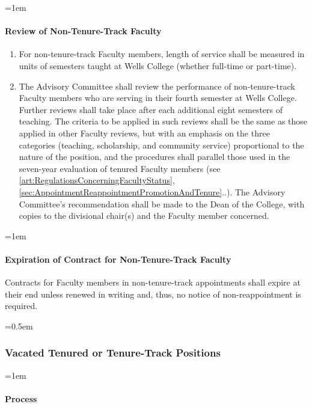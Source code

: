 \documentclass{manual}
\let\oldsubsubsection\subsubsection
\renewcommand\subsubsection{\leftskip=0.5em\oldsubsubsection}
\let\oldparagraph\paragraph
\renewcommand\paragraph{\leftskip=1em\oldparagraph}
\newcommand{\itemLevelA}{\alph*.}
\newcommand{\itemRefA}{\alph*}
\begin{document}
			\paragraph{Review of Non-Tenure-Track Faculty}\label{par:ReviewOfPartTimeVisitingAndOtherNonTenureTrackOfficersOfInstruction}

				\begin{enumerate}[label=\itemLevelA,ref=\itemRefA]
				\item For non-tenure-track Faculty members, length of service shall be measured in units of semesters taught at Wells College (whether full-time or part-time).
				\item The Advisory Committee shall review the performance of non-tenure-track Faculty members who are serving in their fourth semester at Wells College. Further reviews shall take place after each additional eight semesters of teaching. The criteria to be applied in such reviews shall be the same as those applied in other Faculty reviews, but with an emphasis on the three categories (teaching, scholarship, and community service) proportional to the nature of the position, and the procedures shall parallel those used in the seven-year evaluation of tenured Faculty members (see \cref{art:RegulationsConcerningFacultyStatus}, \cref{sec:AppointmentReappointmentPromotionAndTenure}..). The Advisory Committee's recommendation shall be made to the Dean of the College, with copies to the divisional chair(s) and the Faculty member concerned.
				\end{enumerate}

			\paragraph{Expiration of Contract for Non-Tenure-Track Faculty}
			Contracts for Faculty members in non-tenure-track appointments shall expire at their end unless renewed in writing and, thus, no notice of non-reappointment is required.

		\subsubsection{Vacated Tenured or Tenure-Track Positions}

			\paragraph{Process}
\end{document}
